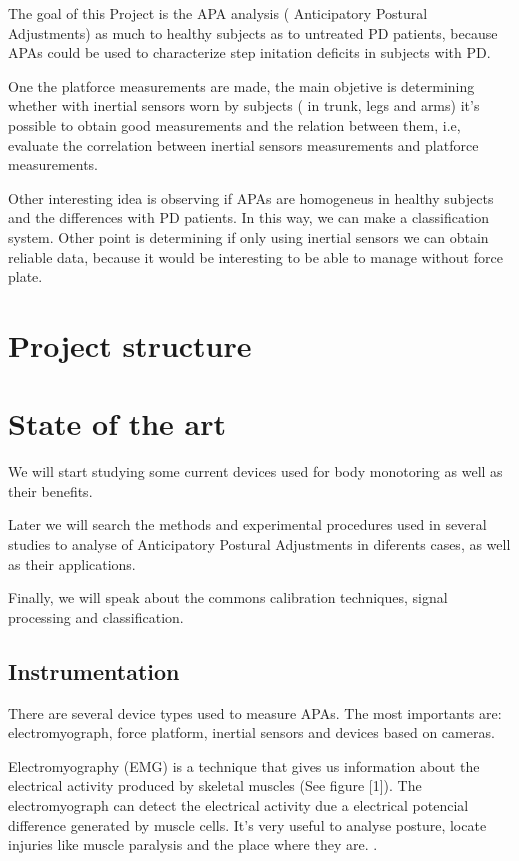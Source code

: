 The goal of this Project is the APA analysis ( Anticipatory Postural Adjustments) as much to healthy subjects as to untreated PD patients, because APAs could be used to characterize step initation deficits in subjects with PD.

One the platforce measurements are made, the main objetive is determining whether with inertial sensors worn by subjects ( in trunk, legs and arms) it’s possible to obtain good measurements and the relation between them, i.e, evaluate the correlation between inertial sensors measurements and platforce measurements.

Other interesting idea is observing if APAs are homogeneus in healthy subjects and the differences with  PD patients. In this way, we can make a classification system.
Other point is determining if only using inertial sensors we can obtain reliable data, because it would be interesting to be able to manage without force plate.


\section{Project structure}

\section{State of the art}

We will start studying some current devices used for body monotoring as well as their benefits.

Later we will search the methods and experimental procedures used in several studies to analyse of Anticipatory Postural Adjustments in diferents cases, as well as their applications.

Finally, we will speak about the commons calibration techniques, signal processing and classification.


\subsection{Instrumentation}

There are several  device types used to measure APAs. The most importants are: electromyograph, force platform, inertial sensors and devices based on cameras. 

Electromyography (EMG) is a technique that gives us information about the electrical activity produced by skeletal muscles (See figure [1]). The electromyograph can detect  the electrical activity due a electrical potencial difference generated by muscle cells. It’s very useful to analyse posture, locate injuries like muscle paralysis and the place where they are. \cite{Marcio2010} \cite{Instr1}. 


